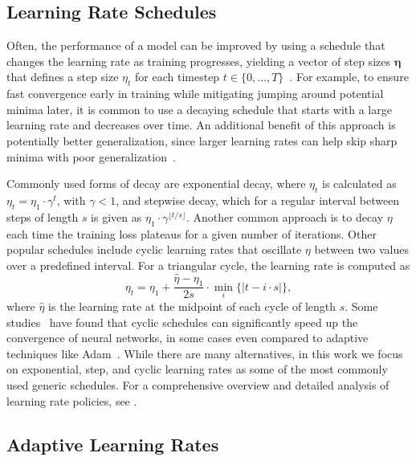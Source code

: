 \documentclass{article} %
\begin{document}
\subsection{Learning Rate Schedules}

Often, the performance of a model can be improved by using a schedule that changes the learning rate as training progresses, yielding a vector of step sizes $\bm{\eta}$ that defines a step size $\eta_t$ for each timestep $t \in \{0, \ldots, T\}$~\citep{wuDemystifyingLearningRate2019b}.
For example, to ensure fast convergence early in training while mitigating jumping around potential minima later, it is common to use a decaying schedule that starts with a large learning rate and decreases over time.
An additional benefit of this approach is potentially better generalization, since larger learning rates can help skip sharp minima with poor generalization~\citep{hochreiterFlatMinima1997,chaudhariEntropySGDBiasingGradient2017}.

Commonly used forms of decay are exponential decay, where $\eta_{t}$ is calculated as
$\eta_{t} = \eta_1 \cdot \gamma^t$,
with $\gamma < 1$, and stepwise decay, which for a regular interval between steps of length $s$ is given as $\eta_1 \cdot \gamma^{\lfloor t/s \rfloor}$.
Another common approach is to decay $\eta$ each time the training loss plateaus for a given number of iterations. Other popular schedules include cyclic learning rates that oscillate $\eta$ between two values over a predefined interval.
For a triangular cycle, the learning rate is computed as
\begin{equation}
   \eta_t = \eta_1 + \frac{\hat{\eta} - \eta_1}{2s} \cdot \min_{i} \{|t-i\cdot s|\},
\end{equation}
where $\hat{\eta}$ is the learning rate at the midpoint of each cycle of length $s$.
Some studies~\citep{smithCyclicalLearningRates2017, smithSuperConvergenceVeryFast2018a} have found that cyclic schedules can significantly speed up the convergence of neural networks, in some cases even compared to adaptive techniques like Adam~\citep{kingmaAdamMethodStochastic2017b}.
While there are many alternatives, in this work we focus on exponential, step, and cyclic learning rates as some of the most commonly used generic schedules.
For a comprehensive overview and detailed analysis of learning rate policies, see \citet{wuDemystifyingLearningRate2019b}.

\subsection{Adaptive Learning Rates}
\end{document}
